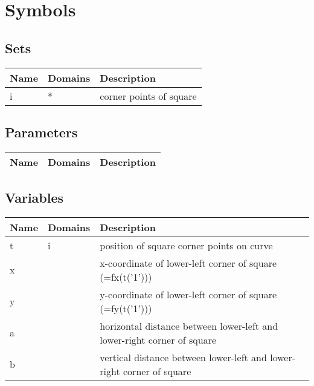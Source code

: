 \documentclass[11pt]{article}
\begin{document}
\section*{Symbols}


\subsection*{Sets}
\begin{tabularx}{\textwidth}{| l | l | X |}
\hline
\textbf{Name} & \textbf{Domains} & \textbf{Description}\\
\hline
\endhead

i & * & corner points of square\\
\hline
\end{tabularx}
\subsection*{Parameters}
\begin{tabularx}{\textwidth}{| l | l | X |}
\hline
\textbf{Name} & \textbf{Domains} & \textbf{Description}\\
\hline
\endhead

\hline
\end{tabularx}
\subsection*{Variables}
\begin{tabularx}{\textwidth}{| l | l | X |}
\hline
\textbf{Name} & \textbf{Domains} & \textbf{Description}\\
\hline
\endhead

t & i & position of square corner points on curve\\
x &  & x-coordinate of lower-left corner of square (=fx(t('1')))\\
y &  & y-coordinate of lower-left corner of square (=fy(t('1')))\\
a &  & horizontal distance between lower-left and lower-right corner of square\\
b &  & vertical distance between lower-left and lower-right corner of square\\
\hline
\end{tabularx}
\end{document}
